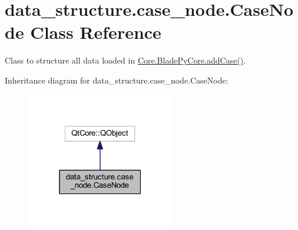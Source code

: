 \hypertarget{a00087}{}\section{data\+\_\+structure.\+case\+\_\+node.\+Case\+Node Class Reference}
\label{a00087}


Class to structure all data loaded in \hyperlink{a00079_a1a62f9b5b8f5929bdb6f0a8c27049d9e}{Core.\+Blade\+Py\+Core.\+add\+Case()}.  




Inheritance diagram for data\+\_\+structure.\+case\+\_\+node.\+Case\+Node\+:
\nopagebreak
\begin{figure}[H]
\begin{center}
\leavevmode
\includegraphics[width=183pt]{a00086}
\end{center}
\end{figure}
